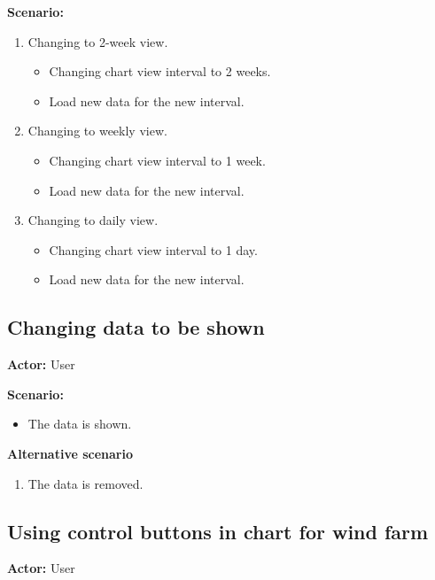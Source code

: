 \textbf{Scenario:}
\begin{enumerate}
\item Changing to 2-week view.
\begin{itemize}
\item Changing chart view interval to 2 weeks.
\item Load new data for the new interval.
\end{itemize}
\item Changing to weekly view.
\begin{itemize}
\item Changing chart view interval to 1 week.
\item Load new data for the new interval.
\end{itemize}
\item Changing to daily view.
\begin{itemize}
\item Changing chart view interval to 1 day.
\item Load new data for the new interval.
\end{itemize}
\end{enumerate}

\subsection{Changing data to be shown}
\textbf{Actor:} User

\textbf{Scenario:}
\begin{itemize}
\item The data is shown.
\end{itemize}
\textbf{Alternative scenario}
\begin{enumerate}
\item The data is removed.
\end{enumerate}

\subsection{Using control buttons in chart for wind farm}
\textbf{Actor:} User

